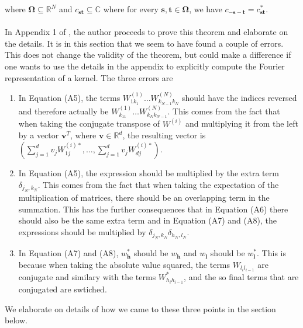 \documentclass{article}
\begin{document}
where $\boldsymbol{\Omega} \subseteq \mathbb{R}^N$ and $c_{\boldsymbol{s}\boldsymbol{t}} \subseteq \mathbb{C}$ where for every $\boldsymbol{s},\boldsymbol{t} \in \boldsymbol{\Omega}$, we have $c_{-\boldsymbol{s}-\boldsymbol{t}}=c^*_{\boldsymbol{s}\boldsymbol{t}}$.\\
\\
In Appendix 1 of \cite{maria}, the author proceeds to prove this theorem and elaborate on the details. It is in this section that we seem to have found a couple of errors. This does not change the validity of the theorem, but could make a difference if one wants to use the details in the appendix to explicitly compute the Fourier representation of a kernel. The three errors are
\begin{enumerate}
	\item In Equation (A5), the terms $W_{1k_1}^{(1)}\ldots W_{k_{N-1}k_N}^{(N)}$ should have the indices reversed and therefore actually be $W_{k_11}^{(1)}\ldots W_{k_Nk_{N-1}}^{(N)}$. This comes from the fact that when taking the conjugate transpose of $W^{(i)}$ and multiplying it from the left by a vector $\boldsymbol{v}^T$, where $\boldsymbol{v} \in \mathbb{R}^d$, the resulting vector is $\left(\sum_{j=1}^dv_jW^{(i)*}_{1j},\ldots,\sum_{j=1}^dv_jW^{(i)*}_{dj}\right)$.
	\item In Equation (A5), the expression should be multiplied by the extra term $\delta_{j_N,k_N}$. This comes from the fact that when taking the expectation of the multiplication of matrices, there should be an overlapping term in the summation. This has the further consequences that in Equation (A6) there should also be the same extra term and in Equation (A7) and (A8), the expressions should be multiplied by $\delta_{j_N,k_N}\delta_{h_N,l_N}$. 
	\item In Equation (A7) and (A8), $w^*_{\boldsymbol{h}}$ should be $w_{\boldsymbol{h}}$ and $w_{\boldsymbol{l}}$ should be $w^*_{\boldsymbol{l}}$. This is because when taking the absolute value squared, the terms $W_{l_il_{i-1}}$ are conjugate and similary with the terms $W^*_{h_ih_{i-1}}$, and the so final terms that are conjugated are swtiched. 
\end{enumerate}
We elaborate on details of how we came to these three points in the section below.
\end{document}
